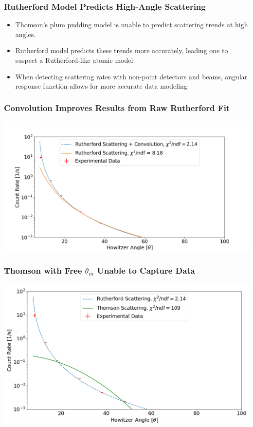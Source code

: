 \documentclass{beamer}
\begin{document}
\begin{frame}
  \frametitle{Rutherford Model Predicts High-Angle Scattering}
  \begin{itemize}
    \pause
  \item Thomson's plum pudding model is unable to predict scattering trends at high angles.
    \pause
  \item Rutherford model predicts these trends more accurately, leading one to suspect a Rutherford-like atomic model
    \pause
  \item When detecting scattering rates with non-point detectors and beams, angular response function allows for more accurate data modeling
\end{itemize}
  \end{frame}

\begin{frame}
  \frametitle{Convolution Improves Results from Raw Rutherford Fit}
  \includegraphics[width=1.0\textwidth]{plot-conv.png}
\end{frame}

\begin{frame}
  \frametitle{Thomson with Free $\theta_m$ Unable to Capture Data}
  \includegraphics[width=1.0\textwidth]{free.png}
\end{frame}
\end{document}
